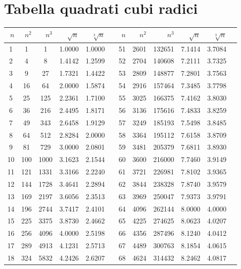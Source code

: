 
\section{Tabella quadrati cubi radici}
\label{sec:Tabellaquadraticubiradici}
	\begin{longtable}{SSSSSSSSSSSS} 
	\toprule
	 &   & &&& &&   & &&  \\
	\midrule \endhead
	\bottomrule \endfoot{}
1&1&1&1.0000&1.0000&&51&2601&132651&7.1414&3.7084\\
2&4&8&1.4142&1.2599&&52&2704&140608&7.2111&3.7325\\
3&9&27&1.7321&1.4422&&53&2809&148877&7.2801&3.7563\\
4&16&64&2.0000&1.5874&&54&2916&157464&7.3485&3.7798\\
5&25&125&2.2361&1.7100&&55&3025&166375&7.4162&3.8030\\
6&36&216&2.4495&1.8171&&56&3136&175616&7.4833&3.8259\\
7&49&343&2.6458&1.9129&&57&3249&185193&7.5498&3.8485\\
8&64&512&2.8284&2.0000&&58&3364&195112&7.6158&3.8709\\
9&81&729&3.0000&2.0801&&59&3481&205379&7.6811&3.8930\\
10&100&1000&3.1623&2.1544&&60&3600&216000&7.7460&3.9149\\
11&121&1331&3.3166&2.2240&&61&3721&226981&7.8102&3.9365\\
12&144&1728&3.4641&2.2894&&62&3844&238328&7.8740&3.9579\\
13&169&2197&3.6056&2.3513&&63&3969&250047&7.9373&3.9791\\
14&196&2744&3.7417&2.4101&&64&4096&262144&8.0000&4.0000\\
15&225&3375&3.8730&2.4662&&65&4225&274625&8.0623&4.0207\\
16&256&4096&4.0000&2.5198&&66&4356&287496&8.1240&4.0412\\
17&289&4913&4.1231&2.5713&&67&4489&300763&8.1854&4.0615\\
18&324&5832&4.2426&2.6207&&68&4624&314432&8.2462&4.0817\\

\end{longtable}
